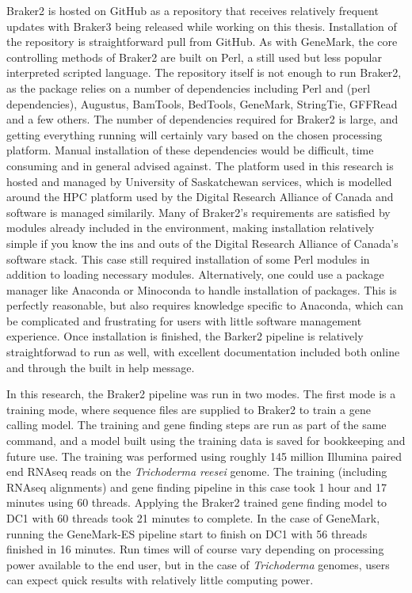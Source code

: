 Braker2 is hosted on GitHub as a repository that receives relatively
frequent updates with Braker3 being released while working on this
thesis. Installation of the repository is straightforward pull from
GitHub. As with GeneMark, the core controlling methods of Braker2 are
built on Perl, a still used but less popular interpreted scripted
language. The repository itself is not enough to run Braker2, as the
package relies on a number of dependencies including Perl and (perl
dependencies), Augustus, BamTools, BedTools, GeneMark, StringTie,
GFFRead and a few others. The number of dependencies required for
Braker2 is large, and getting everything running will certainly vary
based on the chosen processing platform. Manual installation of these
dependencies would be difficult, time consuming and in general advised
against. The platform used in this research is hosted and managed by
University of Saskatchewan services, which is modelled around the HPC
platform used by the Digital Research Alliance of Canada and software
is managed similarily. Many of Braker2's requirements are satisfied by
modules already included in the environment, making installation
relatively simple if you know the ins and outs of the Digital Research
Alliance of Canada's software stack. This case still required
installation of some Perl modules in addition to loading necessary
modules. Alternatively, one could use a package manager like Anaconda
or Minoconda to handle installation of packages. This is perfectly
reasonable, but also requires knowledge specific to Anaconda, which
can be complicated and frustrating for users with little software
management experience. Once installation is finished, the Barker2
pipeline is relatively straightforwad to run as well, with excellent
documentation included both online and through the built in help
message.

In this research, the Braker2 pipeline was run in two modes. The first
mode is a training mode, where sequence files are supplied to Braker2
to train a gene calling model. The training and gene finding steps are
run as part of the same command, and a model built using the training
data is saved for bookkeeping and future use. The training was
performed using roughly 145 million Illumina paired end RNAseq reads
on the \textit{Trichoderma reesei} genome. The training (including
RNAseq alignments) and gene finding pipeline in this case took 1 hour
and 17 minutes using 60 threads. Applying the Braker2 trained gene
finding model to DC1 with 60 threads took 21 minutes to complete. In
the case of GeneMark, running the GeneMark-ES pipeline start to finish
on DC1 with 56 threads finished in 16 minutes. Run times will of
course vary depending on processing power available to the end user,
but in the case of \textit{Trichoderma} genomes, users can expect
quick results with relatively little computing power.


